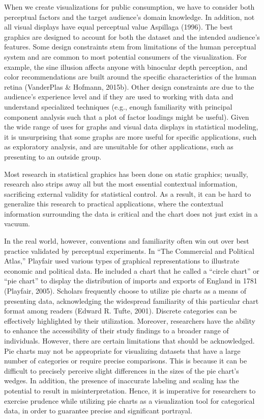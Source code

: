 \documentclass[print]{nuthesis}
\begin{document}
When we create visualizations for public consumption, we have to consider both perceptual factors and the target audience's domain knowledge.
In addition, not all visual displays have equal perceptual value Aspillaga (1996).
The best graphics are designed to account for both the dataset and the intended audience's features.
Some design constraints stem from limitations of the human perceptual system and are common to most potential consumers of the visualization.
For example, the sine illusion affects anyone with binocular depth perception, and color recommendations are built around the specific characteristics of the human retina (VanderPlas \& Hofmann, 2015b).
Other design constraints are due to the audience's experience level and if they are used to working with data and understand specialized techniques (e.g., enough familiarity with principal component analysis such that a plot of factor loadings might be useful).
Given the wide range of uses for graphs and visual data displays in statistical modeling, it is unsurprising that some graphs are more useful for specific applications, such as exploratory analysis, and are unsuitable for other applications, such as presenting to an outside group.

Most research in statistical graphics has been done on static graphics; usually, research also strips away all but the most essential contextual information, sacrificing external validity for statistical control.
As a result, it can be hard to generalize this research to practical applications, where the contextual information surrounding the data is critical and the chart does not just exist in a vacuum.

In the real world, however, conventions and familiarity often win out over best practice validated by perceptual experiments.
In ``The Commercial and Political Atlas,'' Playfair used various types of graphical representations to illustrate economic and political data.
He included a chart that he called a ``circle chart'' or ``pie chart'' to display the distribution of imports and exports of England in 1781 (Playfair, 2005).
Scholars frequently choose to utilize pie charts as a means of presenting data, acknowledging the widespread familiarity of this particular chart format among readers (Edward R. Tufte, 2001).
Discrete categories can be effectively highlighted by their utilization.
Moreover, researchers have the ability to enhance the accessibility of their study findings to a broader range of individuals.
However, there are certain limitations that should be acknowledged.
Pie charts may not be appropriate for visualizing datasets that have a large number of categories or require precise comparisons.
This is because it can be difficult to precisely perceive slight differences in the sizes of the pie chart's wedges.
In addition, the presence of inaccurate labeling and scaling has the potential to result in misinterpretation.
Hence, it is imperative for researchers to exercise prudence while utilizing pie charts as a visualization tool for categorical data, in order to guarantee precise and significant portrayal.
\end{document}
